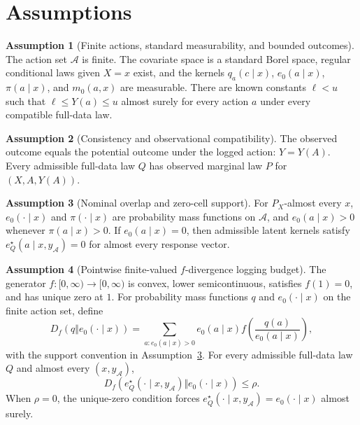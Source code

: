 \documentclass[11pt]{article}
\theoremstyle{definition}
\newtheorem{assumption}{Assumption}
\theoremstyle{plain}
\theoremstyle{remark}
\begin{document}
\section{Assumptions}\label{sec-assumptions}
\begin{assumption}[Finite actions, standard measurability, and bounded outcomes]\label{ass:bounded}
The action set $\mathcal A$ is finite.  The covariate space is a standard
Borel space, regular conditional laws given $X=x$ exist, and the kernels
$q_a(c\mid x)$, $e_0(a\mid x)$, $\pi(a\mid x)$, and $m_0(a,x)$ are measurable.
There are known constants $\ell<u$ such that $\ell\le Y(a)\le u$ almost surely
for every action $a$ under every compatible full-data law.
\end{assumption}

\begin{assumption}[Consistency and observational compatibility]\label{ass:compat}
The observed outcome equals the potential outcome under the logged action:
$Y=Y(A)$.  Every admissible full-data law $Q$ has observed marginal law $P$ for
$(X,A,Y(A))$.
\end{assumption}

\begin{assumption}[Nominal overlap and zero-cell support]\label{ass:overlap}
For $P_X$-almost every $x$, $e_0(\cdot\mid x)$ and $\pi(\cdot\mid x)$ are
probability mass functions on $\mathcal A$, and $e_0(a\mid x)>0$ whenever
$\pi(a\mid x)>0$.  If $e_0(a\mid x)=0$, then admissible latent kernels satisfy
$e_Q^\star(a\mid x,y_{\mathcal A})=0$ for almost every response vector.
\end{assumption}

\begin{assumption}[Pointwise finite-valued $f$-divergence logging budget]\label{ass:f-budget}
The generator $f:[0,\infty)\to[0,\infty)$ is convex, lower semicontinuous,
satisfies $f(1)=0$, and has unique zero at $1$.  For probability mass functions
$q$ and $e_0(\cdot\mid x)$ on the finite action set, define
\[
  D_f(q\Vert e_0(\cdot\mid x))
  =\sum_{a:e_0(a\mid x)>0} e_0(a\mid x)
      f\!\left(\frac{q(a)}{e_0(a\mid x)}\right),
\]
with the support convention in Assumption~\ref{ass:overlap}.  For every
admissible full-data law $Q$ and almost every $(x,y_{\mathcal A})$,
\[
  D_f(e_Q^\star(\cdot\mid x,y_{\mathcal A})\Vert e_0(\cdot\mid x))\le \rho.
\]
When $\rho=0$, the unique-zero condition forces
$e_Q^\star(\cdot\mid x,y_{\mathcal A})=e_0(\cdot\mid x)$ almost surely.
\end{assumption}
\end{document}
